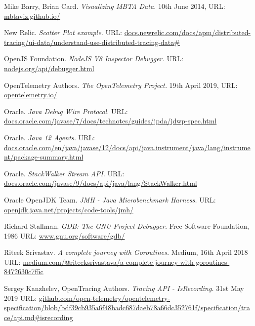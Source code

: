 \documentclass[12pt,pdftex,titlepage]{report}
\begin{document}
\begin{small}
\begin{thebibliography}{69}
        Mike Barry, Brian Card. \textit{Visualizing MBTA Data.}
        10th June 2014, {\scriptsize URL:} \url{mbtaviz.github.io/}

        New Relic. \textit{Scatter Plot example.}
        {\scriptsize URL:} \url{docs.newrelic.com/docs/apm/distributed-tracing/ui-data/understand-use-distributed-tracing-data#}

        OpenJS Foundation. \textit{NodeJS V8 Inspector Debugger.}
        {\scriptsize URL:} \url{nodejs.org/api/debugger.html}

        OpenTelemetry Authors. \textit{The OpenTelemetry Project.}
        19th April 2019, {\scriptsize URL:} \url{opentelemetry.io/}

        Oracle. \textit{Java Debug Wire Protocol.}
        {\scriptsize URL:} \url{docs.oracle.com/javase/7/docs/technotes/guides/jpda/jdwp-spec.html}

        Oracle. \textit{Java 12 Agents.}
        {\scriptsize URL:} \url{docs.oracle.com/en/java/javase/12/docs/api/java.instrument/java/lang/instrument/package-summary.html}

        Oracle. \textit{StackWalker Stream API.}
        {\scriptsize URL:} \url{docs.oracle.com/javase/9/docs/api/java/lang/StackWalker.html}

        Oracle OpenJDK Team. \textit{JMH - Java Microbenchmark Harness.}
        {\scriptsize URL:} \url{openjdk.java.net/projects/code-tools/jmh/}
       
        Richard Stallman. \textit{GDB: The GNU Project Debugger.}
        Free Software Foundation, 1986
        {\scriptsize URL:} \url{www.gnu.org/software/gdb/}
        
        Riteek Srivastav. \textit{A complete journey with Goroutines.}
        Medium, 16th April 2018
        {\scriptsize URL:} \url{medium.com/@riteeksrivastava/a-complete-journey-with-goroutines-8472630c7f5c}

        Sergey Kanzhelev, OpenTracing Authors. \textit{Tracing API - IsRecording.}
        31st May 2019
        {\scriptsize URL:} \url{github.com/open-telemetry/opentelemetry-specification/blob/bdf39cb935a6f48badc687daeb78a66dc352761f/specification/trace/api.md#isrecording}


\end{thebibliography}
\end{small}
\end{document}
